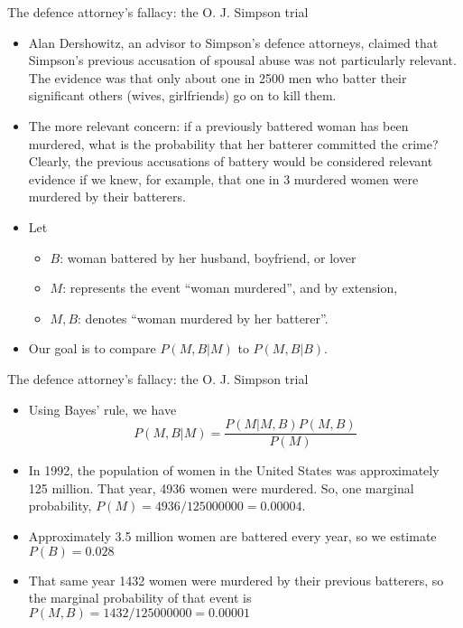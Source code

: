 \documentclass[10pt]{beamer}\usepackage[]{graphicx}\usepackage[]{color}
\begin{document}
\begin{frame}{The defence attorney's fallacy:
the O. J. Simpson trial}
	\begin{itemize}
		\item Alan Dershowitz, an advisor to
		Simpson’s defence attorneys, claimed that
		Simpson’s previous accusation of spousal
		abuse was not particularly relevant. The
		evidence was that only about one in 2500
		men who batter their significant others (wives,
		girlfriends) go on to kill them. \pause 
		\item The more relevant concern:
		if a previously battered woman has been
		murdered, what is the probability that her
		batterer committed the crime? Clearly,
		the previous accusations of battery would be
		considered relevant evidence if we knew, for example, that
		one in 3 murdered women were murdered by
		their batterers. \pause 
		\item Let 
		\begin{itemize}
			\item $B$: woman battered by her husband, boyfriend,
or lover
			\item $M$: represents the event “woman
murdered”, and by extension, 
			\item $M,B$: denotes
“woman murdered by her batterer”. 
			\end{itemize}
		\item Our goal is to compare $P(M,B|M)$ to $P(M,B|B)$.
	\end{itemize}
	
\end{frame}


\begin{frame}{The defence attorney's fallacy:
the O. J. Simpson trial}
	\vspace*{-.71in}
	\begin{itemize}
		\item Using Bayes’ rule, we have
		$$P(M, B | M) = \frac{P(M | M, B) P(M, B)}{P(M)}$$ \pause 
		\item In 1992, the population of women
		in the United States was approximately
		125 million. That year, 4936 women were
		murdered. So, one marginal probability, $P(M)
= 4936/125 000 000 = 0.000 04$. 
		\item Approximately 3.5 million women
are battered every year, so we estimate $P(B) = 0.028$
		\item That
same year 1432 women were murdered by their
previous batterers, so the marginal probability
		of that event is $P(M, B) = 1432/125 000 000 =
0.000 01$
	\end{itemize}
	
\end{frame}
\end{document}
